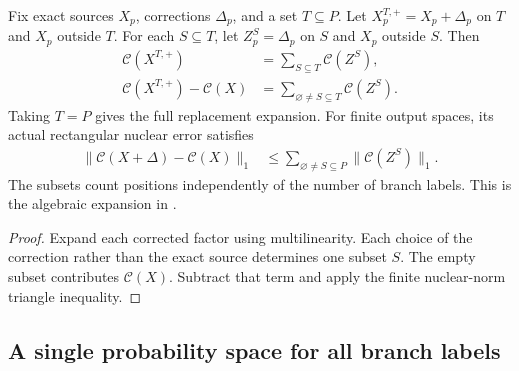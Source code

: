 \begin{theorem}
    \label{thm:construction_position_expansion}
    \leanok
    Fix exact sources $X_p$, corrections $\Delta_p$, and a set
    $T\subseteq P$. Let $X^{T,+}_p=X_p+\Delta_p$ on $T$ and $X_p$
    outside $T$. For each $S\subseteq T$, let $Z^S_p=\Delta_p$ on $S$
    and $X_p$ outside $S$. Then
    \begin{align}
        \mathcal C(X^{T,+}) & =\sum_{S\subseteq T}\mathcal C(Z^S),
        \label{eq:construction_position_sum}                                      \\
        \mathcal C(X^{T,+})-\mathcal C(X)
                            & =\sum_{\varnothing\ne S\subseteq T}\mathcal C(Z^S).
        \label{eq:construction_nonempty_sum}
    \end{align}
    Taking $T=P$ gives the full replacement expansion. For finite
    output spaces, its actual rectangular nuclear error satisfies
    \begin{align}
        \lVert\mathcal C(X+\Delta)-\mathcal C(X)\rVert_1
         & \leq\sum_{\varnothing\ne S\subseteq P}
        \lVert\mathcal C(Z^S)\rVert_1.
        \label{eq:construction_position_norm}
    \end{align}
    The subsets count positions independently of the number of branch
    labels. This is the algebraic expansion in
    \cite[Equation~(5.9)]{OpenAI2026PolynomialPEPS}.
\end{theorem}

\begin{proof}\leanok
    Expand each corrected factor using multilinearity. Each choice
    of the correction rather than the exact source determines one
    subset $S$. The empty subset contributes $\mathcal C(X)$.
    Subtract that term and apply the finite nuclear-norm triangle
    inequality.
\end{proof}

\subsection{A single probability space for all branch labels}

